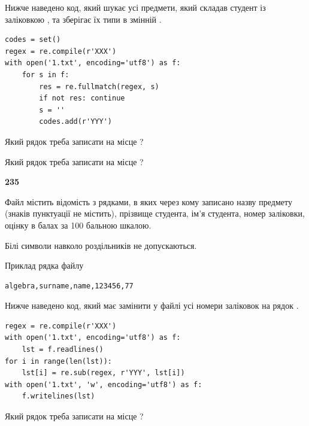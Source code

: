 Нижче наведено код, який шукає усі предмети, який складав студент із заліковкою , та зберігає їх типи в змінній .



\begin{verbatim}
codes = set()
regex = re.compile(r'XXX')
with open('1.txt', encoding='utf8') as f:
    for s in f:
        res = re.fullmatch(regex, s)
        if not res: continue
        s = ''
        codes.add(r'YYY')
\end{verbatim}





Який рядок треба записати на місце  ?\par
\vspace{5mm}


Який рядок треба записати на місце  ?\par


\newpage

{\begin {center}\textbf{ 235}\end {center}}\par
Файл  містить відомість з рядками, в яких через кому записа\-но назву предмету (знаків пунктуації не містить), прізвище студента, ім'я студента, номер залі\-ков\-ки, оцінку в балах за 100 бальною шкалою.

Білі символи навколо роздільників не допускаються.

Приклад рядка файлу



\begin{verbatim}
algebra,surname,name,123456,77
\end{verbatim}


Нижче наведено код, який має замінити у файлі усі номери заліковок на рядок \code{***}.



\begin{verbatim}
regex = re.compile(r'XXX')
with open('1.txt', encoding='utf8') as f:
    lst = f.readlines()
for i in range(len(lst)):
    lst[i] = re.sub(regex, r'YYY', lst[i])
with open('1.txt', 'w', encoding='utf8') as f:
    f.writelines(lst)
\end{verbatim}







Який рядок треба записати на місце  ?\par
\vspace{5mm}



